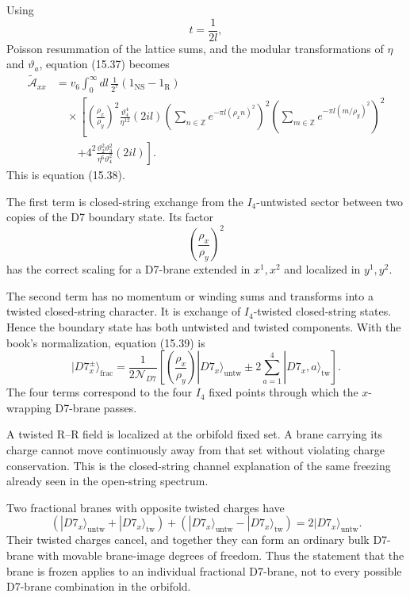 \documentclass[
  10pt,
  a4paper,
  openany]{book}
\begin{document}
Using \[
t=\frac1{2l},
\] Poisson resummation of the lattice sums, and the modular
transformations of \(\eta\) and \(\vartheta_a\), equation (15.37)
becomes \[
\boxed{
\begin{aligned}
\widetilde{\mathcal A}_{xx}
&=
v_6\int_0^\infty dl\,
\frac1{2^7}
(1_{\mathrm{NS}}-1_{\mathrm R})\\
&\quad\times
\left[
\left(\frac{\rho_x}{\rho_y}\right)^2
\frac{\vartheta_4^4}{\eta^{12}}(2il)
\left(
\sum_{n\in\mathbb Z}
e^{-\pi l(\rho_xn)^2}
\right)^2
\left(
\sum_{m\in\mathbb Z}
e^{-\pi l(m/\rho_y)^2}
\right)^2\right.\\
&\qquad\left.
+
4^2
\frac{\vartheta_2^2\vartheta_3^2}
{\eta^6\vartheta_4^2}(2il)
\right].
\end{aligned}
}
\] This is equation (15.38).

The first term is closed-string exchange from the \(I_4\)-untwisted
sector between two copies of the D7 boundary state. Its factor \[
\left(\frac{\rho_x}{\rho_y}\right)^2
\] has the correct scaling for a D7-brane extended in \(x^1,x^2\) and
localized in \(y^1,y^2\).

The second term has no momentum or winding sums and transforms into a
twisted closed-string character. It is exchange of \(I_4\)-twisted
closed-string states. Hence the boundary state has both untwisted and
twisted components. With the book's normalization, equation (15.39) is
\[
|D7_x^\pm\rangle_{\mathrm{frac}}
=
\frac{1}{2\mathcal N_{D7}}
\left[
\left(\frac{\rho_x}{\rho_y}\right)
|D7_x\rangle_{\mathrm{untw}}
\pm
2\sum_{a=1}^{4}
|D7_x,a\rangle_{\mathrm{tw}}
\right].
\] The four terms correspond to the four \(I_4\) fixed points through
which the \(x\)-wrapping D7-brane passes.

A twisted R--R field is localized at the orbifold fixed set. A brane
carrying its charge cannot move continuously away from that set without
violating charge conservation. This is the closed-string channel
explanation of the same freezing already seen in the open-string
spectrum.

Two fractional branes with opposite twisted charges have \[
\left(
|D7_x\rangle_{\mathrm{untw}}
+
|D7_x\rangle_{\mathrm{tw}}
\right)
+
\left(
|D7_x\rangle_{\mathrm{untw}}
-
|D7_x\rangle_{\mathrm{tw}}
\right)
=
2|D7_x\rangle_{\mathrm{untw}}.
\] Their twisted charges cancel, and together they can form an ordinary
bulk D7-brane with movable brane-image degrees of freedom. Thus the
statement that the brane is frozen applies to an individual fractional
D7-brane, not to every possible D7-brane combination in the orbifold.
\end{document}

